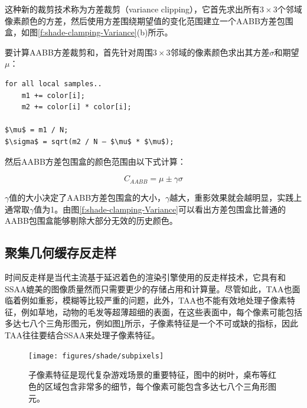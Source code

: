 这种新的裁剪技术称为方差裁剪（variance clipping），它首先求出所有$3\times 3$个邻域像素颜色的方差，然后使用方差围绕期望值的变化范围建立一个AABB方差包围盒，如图\ref{f:shade-clamping-Variance}(b)所示。

要计算AABB方差裁剪和，首先针对周围$3\times 3$邻域的像素颜色求出其方差$\sigma$和期望$\mu$：

\begin{lstlisting}[mathescape=true]
for all local samples..
    m1 += color[i];
    m2 += color[i] * color[i];
    	
$\mu$ = m1 / N;
$\sigma$ = sqrt(m2 / N – $\mu$ * $\mu$);
\end{lstlisting}

然后AABB方差包围盒的颜色范围由以下式计算：

\begin{equation}
	C_{AABB}=\mu\pm\gamma\sigma
\end{equation}

$\gamma$值的大小决定了AABB方差包围盒的大小，$\gamma$越大，重影效果就会越明显，实践上通常取$\gamma$值为1。由图\ref{f:shade-clamping-Variance}可以看出方差包围盒比普通的AABB包围盒能够剔除大部分无效的历史颜色。













\subsection{聚集几何缓存反走样}
时间反走样是当代主流基于延迟着色的渲染引擎使用的反走样技术，它具有和SSAA媲美的图像质量然而只需要更少的存储占用和计算量。尽管如此，TAA也面临着例如重影，模糊等比较严重的问题，此外，TAA也不能有效地处理子像素特征，例如草地，动物的毛发等超薄超细的表面，在这些表面中，每个像素可能包括多达七八个三角形图元，例如图\ref{f:shade-subpixels}所示，子像素特征是一个不可或缺的指标，因此TAA往往要结合SSAA来处理子像素特征。

\begin{figure}
\begin{fullwidth}
	\texttt{[image: figures/shade/subpixels]}
	\caption{子像素特征是现代复杂游戏场景的重要特征，图中的树叶，桌布等红色的区域包含非常多的细节，每个像素可能包含多达七八个三角形图元。}
	\label{f:shade-subpixels}
\end{fullwidth}
\end{figure}


